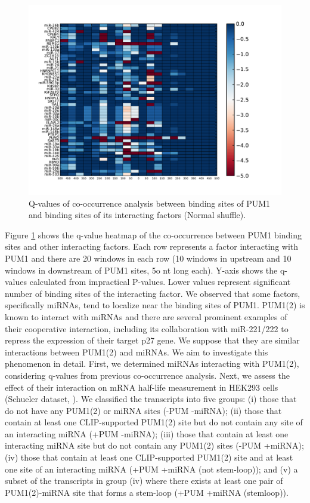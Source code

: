 \begin{figure}[H]
	\centering
	\includegraphics[width=1.15\textwidth,clip]{ch4_results_discussion/figures/PUM1_normal_expressed_heatmap_qvalues0.pdf}
\caption[Interaction of PUM1 protein with its interacting factors]{Q-values of co-occurrence analysis between binding sites of PUM1 and binding sites of its interacting factors (Normal shuffle).}
\label{PUM_qvalue_heatmap}
\end{figure}
\clearpage
Figure \ref{PUM_qvalue_heatmap} shows the q-value heatmap of the co-occurrence between PUM1 binding sites and other interacting factors. Each row represents a factor interacting with PUM1 and there are 20 windows in each row (10 windows in upstream and 10 windows in downstream of PUM1 sites, 5o nt long each). Y-axis shows the q-values calculated from impractical P-values. Lower values represent significant number of binding sites of the interacting factor. We observed that some factors, specifically miRNAs, tend to localize near the binding sites of PUM1. PUM1(2) is known to interact with miRNAs and there are several prominent examples of their cooperative interaction, including its collaboration with miR-221/222 to repress the expression of their target p27 gene. We suppose that they are similar interactions between PUM1(2) and miRNAs. We aim to investigate this phenomenon in detail. First, we determined miRNAs interacting with PUM1(2), considering q-values from previous co-occurrence analysis. Next, we assess the effect of their interaction on mRNA half-life measurement in HEK293 cells (Schueler dataset, \cite{schueler_14}). We classified the transcripts into five groups: (i) those that do not have any PUM1(2) or miRNA sites (-PUM -miRNA); (ii) those that contain at least one CLIP-supported PUM1(2) site but do not contain any site of an interacting miRNA (+PUM -miRNA); (iii) those that contain at least one interacting miRNA site but do not contain any PUM1(2) sites (-PUM +miRNA); (iv) those that contain at least one CLIP-supported PUM1(2) site and at least one site of an interacting miRNA (+PUM +miRNA (not stem-loop)); and (v) a subset of the transcripts in group (iv) where there exists at least one pair of PUM1(2)-miRNA site that forms a stem-loop (+PUM +miRNA (stemloop)).

